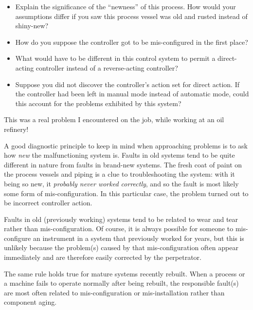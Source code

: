 \begin{itemize}
\item{} Explain the significance of the ``newness'' of this process.  How would your assumptions differ if you saw this process vessel was old and rusted instead of shiny-new?
\item{} How do you suppose the controller got to be mis-configured in the first place?
\item{} What would have to be different in this control system to permit a direct-acting controller instead of a reverse-acting controller?
\item{} Suppose you did not discover the controller's action set for direct action.  If the controller had been left in manual mode instead of automatic mode, could this account for the problems exhibited by this system?
\end{itemize}














This was a real problem I encountered on the job, while working at an oil refinery!

\vskip 10pt

A good diagnostic principle to keep in mind when approaching problems is to ask how {\it new} the malfunctioning system is.  Faults in old systems tend to be quite different in nature from faults in brand-new systems.  The fresh coat of paint on the process vessels and piping is a clue to troubleshooting the system: with it being so new, it {\it probably never worked correctly}, and so the fault is most likely some form of mis-configuration.  In this particular case, the problem turned out to be incorrect controller action.  

Faults in old (previously working) systems tend to be related to wear and tear rather than mis-configuration.  Of course, it is always possible for someone to mis-configure an instrument in a system that previously worked for years, but this is unlikely because the problem(s) caused by that mis-configuration often appear immediately and are therefore easily corrected by the perpetrator.

The same rule holds true for mature systems recently rebuilt.  When a process or a machine fails to operate normally after being rebuilt, the responsible fault(s) are most often related to mis-configuration or mis-installation rather than component aging.

